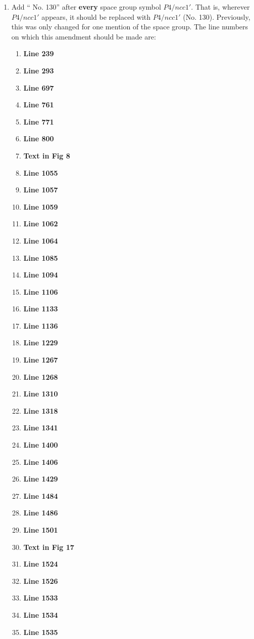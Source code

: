 \documentclass[aps,reprint,notitlepage,onecolumn,12pt]{revtex4-2}
\numberwithin{equation}{section}
\begin{document}
\begin{enumerate}
\begin{enumerate}
        
    \end{enumerate}
    \item Add `` No. 130'' after \textbf{every} space group symbol $P4/ncc1'$. That is, wherever $P4/ncc1'$ appears, it should be replaced with $P4/ncc1'$ (No. 130). Previously, this was only changed for one mention of the space group. The line numbers on which this amendment should be made are:
    \begin{enumerate}
        \item \textbf{Line 239}
        \item \textbf{Line 293}
        \item \textbf{Line 697}
        \item \textbf{Line 761}
        \item \textbf{Line 771}
        \item \textbf{Line 800}
        \item \textbf{Text in Fig 8}
        \item \textbf{Line 1055}
        \item \textbf{Line 1057}
        \item \textbf{Line 1059}
        \item \textbf{Line 1062}
        \item \textbf{Line 1064}
        \item \textbf{Line 1085}
        \item \textbf{Line 1094}
        \item \textbf{Line 1106}
        \item \textbf{Line 1133}
        \item \textbf{Line 1136}
        \item \textbf{Line 1229}
        \item \textbf{Line 1267}
        \item \textbf{Line 1268}
        \item \textbf{Line 1310}
        \item \textbf{Line 1318}
        \item \textbf{Line 1341}
        \item \textbf{Line 1400}
        \item \textbf{Line 1406}
        \item \textbf{Line 1429}
        \item \textbf{Line 1484}
        \item \textbf{Line 1486}
        \item \textbf{Line 1501}
        \item \textbf{Text in Fig 17}
        \item \textbf{Line 1524}
        \item \textbf{Line 1526}
        \item \textbf{Line 1533}
        \item \textbf{Line 1534}
        \item \textbf{Line 1535}
        

\end{enumerate}
\end{enumerate}
\end{document}
